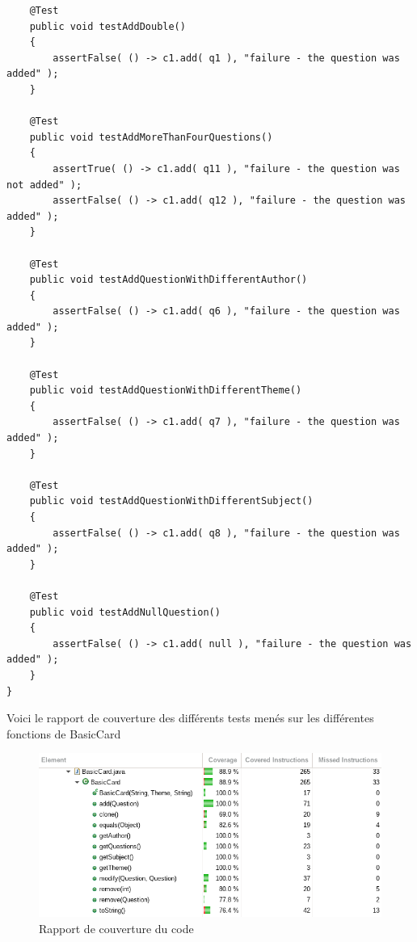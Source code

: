 \begin{lstlisting}
    @Test
    public void testAddDouble()
    {
        assertFalse( () -> c1.add( q1 ), "failure - the question was added" );
    }

    @Test
    public void testAddMoreThanFourQuestions()
    {
        assertTrue( () -> c1.add( q11 ), "failure - the question was not added" );
        assertFalse( () -> c1.add( q12 ), "failure - the question was added" );
    }

    @Test
    public void testAddQuestionWithDifferentAuthor()
    {
        assertFalse( () -> c1.add( q6 ), "failure - the question was added" );
    }

    @Test
    public void testAddQuestionWithDifferentTheme()
    {
        assertFalse( () -> c1.add( q7 ), "failure - the question was added" );
    }

    @Test
    public void testAddQuestionWithDifferentSubject()
    {
        assertFalse( () -> c1.add( q8 ), "failure - the question was added" );
    }

    @Test
    public void testAddNullQuestion()
    {
        assertFalse( () -> c1.add( null ), "failure - the question was added" );
    }
}
\end{lstlisting}

Voici le rapport de couverture des différents tests menés sur les différentes fonctions de BasicCard

\begin{figure}[h]
	\centering
	\includegraphics[width=\textwidth]{junit_coverage.png}
	\caption{Rapport de couverture du code}
	\label{fig:diag_coverage}
\end{figure}

